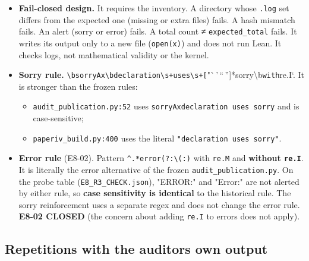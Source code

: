 \documentclass[
]{article}
\providecommand{\tightlist}{%
  \setlength{\itemsep}{0pt}\setlength{\parskip}{0pt}}
\begin{document}
\begin{itemize}
\tightlist
\item
  \textbf{Fail-closed design.} It requires the inventory. A directory
  whose \texttt{.log} set differs from the expected one (missing or
  extra files) fails. A hash mismatch fails. An alert (sorry or error)
  fails. A total count ≠ \texttt{expected\_total} fails. It writes its
  output only to a new file
  (\texttt{open(\textquotesingle{}x\textquotesingle{})}) and does not
  run Lean. It checks logs, not mathematical validity or the kernel.
\item
  \textbf{Sorry rule.}
  \texttt{\textbackslash{}bsorryAx\textbackslash{}b\textbar{}declaration\textbackslash{}s+uses\textbackslash{}s+{[}}\textquotesingle"`\,'\,``\,''{]}*sorry\textbackslash b\texttt{with}re.I`.
  It is stronger than the frozen rules:

  \begin{itemize}
  \tightlist
  \item
    \texttt{audit\_publication.py:52} uses
    \texttt{sorryAx\textbar{}declaration\ uses\ \textquotesingle{}sorry\textquotesingle{}}
    and is case-sensitive;
  \item
    \texttt{paperiv\_build.py:400} uses the literal
    \texttt{"declaration\ uses\ \textquotesingle{}sorry\textquotesingle{}"}.
  \end{itemize}
\item
  \textbf{Error rule} (E8-02). Pattern
  \texttt{\^{}.*error(?:\textbackslash{}(\textbar{}:)} with
  \texttt{re.M} and \textbf{without \texttt{re.I}}. It is literally the
  error alternative of the frozen \texttt{audit\_publication.py}. On the
  probe table (\texttt{E8\_R3\_CHECK.json}), "ERROR:" and "Error:" are
  not alerted by either rule, so \textbf{case sensitivity is identical}
  to the historical rule. The sorry reinforcement uses a separate regex
  and does not change the error rule. \textbf{E8-02 CLOSED} (the concern
  about adding \texttt{re.I} to errors does not apply).
\end{itemize}

\subsection{Repetitions with the auditor\textquotesingle s own
output}\label{repetitions-with-the-auditors-own-output}
\end{document}
